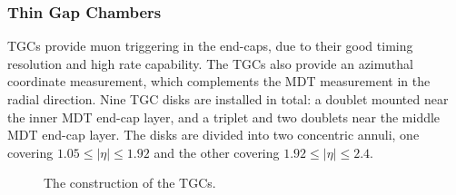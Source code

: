 \subsubsection{Thin Gap Chambers}
TGCs provide muon triggering in the end-caps, due to their good timing resolution and high rate capability. The TGCs also provide an azimuthal coordinate measurement, which complements the MDT measurement in the radial direction. Nine TGC disks are installed in total: a doublet mounted near the inner MDT end-cap layer, and a triplet and two doublets near the middle MDT end-cap layer. The disks are divided into two concentric annuli, one covering $1.05\leq |\eta| \leq 1.92$ and the other covering $1.92\leq|\eta|\leq2.4$. 

\begin{figure}[htbp]
	\centering
	\hfill
	\caption{The construction of the TGCs.}
	\label{fig:ATLAS-MS-TGC}
\end{figure}

